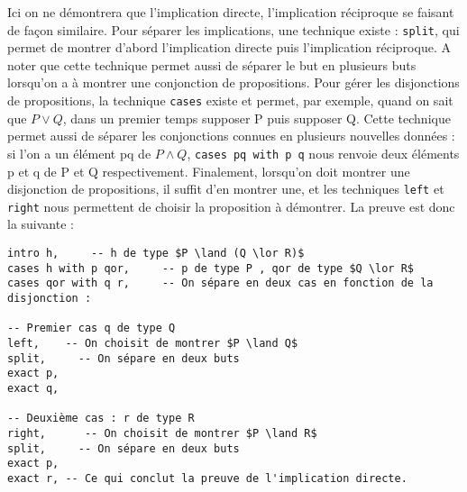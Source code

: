 Ici on ne démontrera que l'implication directe, l'implication réciproque se faisant de façon similaire.
Pour séparer les implications, une technique existe : \texttt{split}, qui permet de montrer d'abord l'implication directe puis l'implication réciproque. A noter que cette technique permet aussi de séparer le but en plusieurs buts lorsqu'on a à montrer une conjonction de propositions.
Pour gérer les disjonctions de propositions, la technique \texttt{cases} existe et permet, par exemple, quand on sait que $P\lor Q$, dans un premier temps supposer P puis supposer Q. Cette technique permet aussi de séparer les conjonctions connues en plusieurs nouvelles données : si l'on a un élément pq de $P\land Q$, \texttt{cases pq with p q} nous renvoie deux éléments p et q de P et Q respectivement.
Finalement, lorsqu'on doit montrer une disjonction de propositions, il suffit d'en montrer une, et les techniques \texttt{left} et \texttt{right} nous permettent de choisir la proposition à démontrer.
La preuve est donc la suivante : 
\begin{verbatim}
intro h,     -- h de type $P \land (Q \lor R)$
cases h with p qor,     -- p de type P , qor de type $Q \lor R$
cases qor with q r,     -- On sépare en deux cas en fonction de la disjonction :

-- Premier cas q de type Q
left,    -- On choisit de montrer $P \land Q$
split,     -- On sépare en deux buts
exact p,
exact q,

-- Deuxième cas : r de type R
right,      -- On choisit de montrer $P \land R$
split,     -- On sépare en deux buts
exact p,
exact r, -- Ce qui conclut la preuve de l'implication directe.
\end{verbatim}
